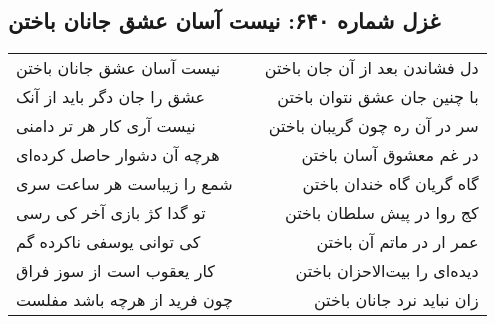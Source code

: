 \begin{center}
\section*{غزل شماره ۶۴۰: نیست آسان عشق جانان باختن}
\label{sec:640}
\begin{longtable}{l p{0.5cm} r}
نیست آسان عشق جانان باختن
&&
دل فشاندن بعد از آن جان باختن
\\
عشق را جان دگر باید از آنک
&&
با چنین جان عشق نتوان باختن
\\
نیست آری کار هر تر دامنی
&&
سر در آن ره چون گریبان باختن
\\
هرچه آن دشوار حاصل کرده‌ای
&&
در غم معشوق آسان باختن
\\
شمع را زیباست هر ساعت سری
&&
گاه گریان گاه خندان باختن
\\
تو گدا کژ بازی آخر کی رسی
&&
کج روا در پیش سلطان باختن
\\
کی توانی یوسفی ناکرده گم
&&
عمر ار در ماتم آن باختن
\\
کار یعقوب است از سوز فراق
&&
دیده‌ای را بیت‌الاحزان باختن
\\
چون فرید از هرچه باشد مفلست
&&
زان نباید نرد جانان باختن
\\
\end{longtable}
\end{center}
